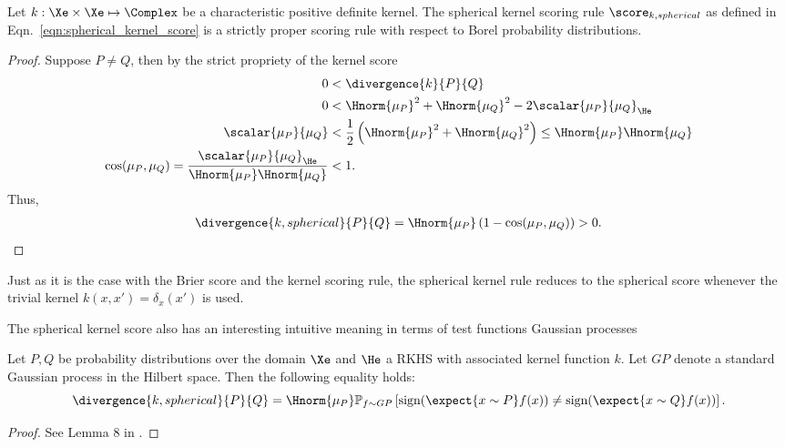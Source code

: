 \begin{theorem}
Let $k:\Xe\times\Xe\mapsto\Complex$ be a characteristic positive definite kernel. The spherical kernel scoring rule $\score_{k,spherical}$ as defined in Eqn.\ \ref{eqn:spherical_kernel_score} is a strictly proper scoring rule with respect to Borel probability distributions.

\begin{proof}
	Suppose $P\neq Q$, then by the strict propriety of the kernel score
	\begin{align}
		0 &< \divergence{k}{P}{Q}\\
		0 &< \Hnorm{\mu_P}^2 + \Hnorm{\mu_Q}^2 - 2\scalar{\mu_P}{\mu_Q} _{\He}\\
		\scalar{\mu_P}{\mu_Q} &< \frac{1}{2}\left(\Hnorm{\mu_P}^2 + \Hnorm{\mu_Q}^2\right) \leq \Hnorm{\mu_P}\Hnorm{\mu_Q}\\
		\cos(\mu_P,\mu_Q) = \frac{\scalar{\mu_P}{\mu_Q} _{\He}}{\Hnorm{\mu_P}\Hnorm{\mu_Q}} &< 1.
	\end{align}
	Thus,
	\begin{align}
		\divergence{k,spherical}{P}{Q} = \Hnorm{\mu_P} \left( 1 - \cos(\mu_P, \mu_Q)\right) > 0.
	\end{align}
\end{proof}
\end{theorem}

Just as it is the case with the Brier score and the kernel scoring rule, the spherical kernel rule reduces to the spherical score whenever the trivial kernel $k(x,x') = \delta_{x}(x')$ is used.

The spherical kernel score also has an interesting intuitive meaning in terms of test functions Gaussian processes

\begin{proposition}\label{prop:sign_random_function}
Let $P,Q$ be probability distributions over the domain $\Xe$ and $\He$ a RKHS with associated kernel function $k$. Let $GP$ denote a standard Gaussian process in the Hilbert space. Then the following equality holds:
%
\begin{equation}
	 \divergence{k,spherical}{P}{Q} = \Hnorm{\mu_P} \mathbb{P}_{f\sim GP} \left[ \mbox{sign}(\expect{x\sim P} f(x)) \neq \mbox{sign}(\expect{x\sim Q} f(x)) \right]. \label{eqn:sign_random_function}
\end{equation}
\begin{proof}
See Lemma 8 in \citep{Goemans1995}.
\end{proof}
\end{proposition}

